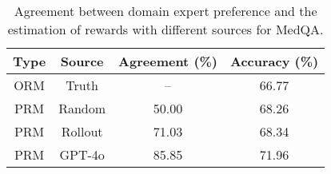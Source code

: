 \begin{table}[h!]\small
    \small
    \centering
    \caption{Agreement between domain expert preference and the estimation of rewards with different sources for MedQA.}
    \vskip 0.15in
    \begin{tabular}{cccc}
    \toprule
        \bf Type & \bf Source & \bf Agreement (\%) & \bf Accuracy (\%) \\
        \midrule
        ORM & Truth & -- & 66.77 \\
        PRM & Random & 50.00 & 68.26 \\
        PRM & Rollout & 71.03 & 68.34 \\
        PRM & GPT-4o & 85.85 & 71.96 \\
        \bottomrule
    \end{tabular}
    \label{tab:human_eval}
\end{table}

